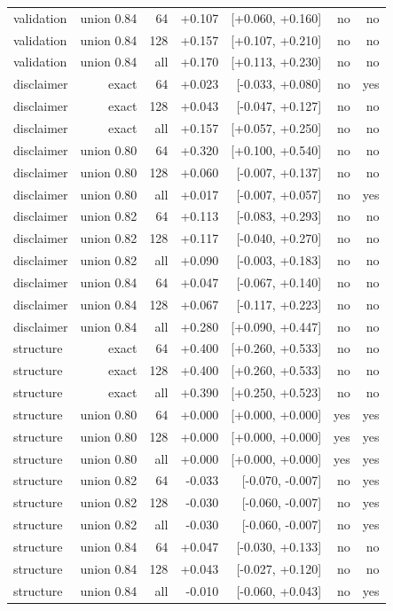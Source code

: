 \begin{tabular}{lrrrrrr}
validation & union 0.84 & 64 & +0.107 & [+0.060, +0.160] & no & no \\
validation & union 0.84 & 128 & +0.157 & [+0.107, +0.210] & no & no \\
validation & union 0.84 & all & +0.170 & [+0.113, +0.230] & no & no \\
disclaimer & exact & 64 & +0.023 & [-0.033, +0.080] & no & yes \\
disclaimer & exact & 128 & +0.043 & [-0.047, +0.127] & no & no \\
disclaimer & exact & all & +0.157 & [+0.057, +0.250] & no & no \\
disclaimer & union 0.80 & 64 & +0.320 & [+0.100, +0.540] & no & no \\
disclaimer & union 0.80 & 128 & +0.060 & [-0.007, +0.137] & no & no \\
disclaimer & union 0.80 & all & +0.017 & [-0.007, +0.057] & no & yes \\
disclaimer & union 0.82 & 64 & +0.113 & [-0.083, +0.293] & no & no \\
disclaimer & union 0.82 & 128 & +0.117 & [-0.040, +0.270] & no & no \\
disclaimer & union 0.82 & all & +0.090 & [-0.003, +0.183] & no & no \\
disclaimer & union 0.84 & 64 & +0.047 & [-0.067, +0.140] & no & no \\
disclaimer & union 0.84 & 128 & +0.067 & [-0.117, +0.223] & no & no \\
disclaimer & union 0.84 & all & +0.280 & [+0.090, +0.447] & no & no \\
structure & exact & 64 & +0.400 & [+0.260, +0.533] & no & no \\
structure & exact & 128 & +0.400 & [+0.260, +0.533] & no & no \\
structure & exact & all & +0.390 & [+0.250, +0.523] & no & no \\
structure & union 0.80 & 64 & +0.000 & [+0.000, +0.000] & yes & yes \\
structure & union 0.80 & 128 & +0.000 & [+0.000, +0.000] & yes & yes \\
structure & union 0.80 & all & +0.000 & [+0.000, +0.000] & yes & yes \\
structure & union 0.82 & 64 & -0.033 & [-0.070, -0.007] & no & yes \\
structure & union 0.82 & 128 & -0.030 & [-0.060, -0.007] & no & yes \\
structure & union 0.82 & all & -0.030 & [-0.060, -0.007] & no & yes \\
structure & union 0.84 & 64 & +0.047 & [-0.030, +0.133] & no & no \\
structure & union 0.84 & 128 & +0.043 & [-0.027, +0.120] & no & no \\
structure & union 0.84 & all & -0.010 & [-0.060, +0.043] & no & yes \\
\bottomrule
\end{tabular}
